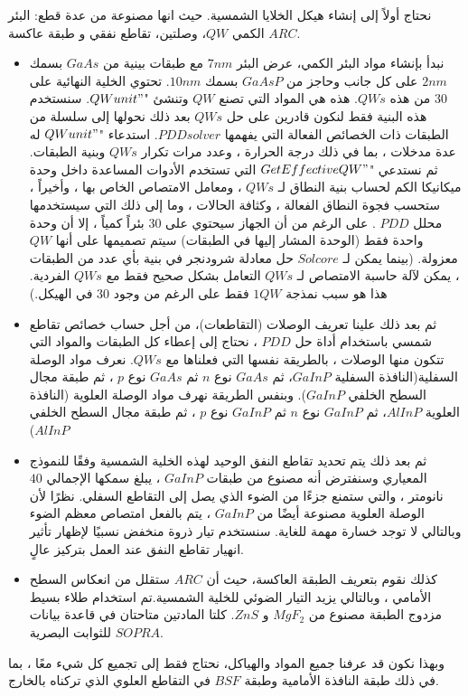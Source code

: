 	
نحتاج أولاً إلى إنشاء هيكل الخلايا الشمسية. حيث انها مصنوعة من عدة قطع: البئر الكمي $ QW $،  وصلتين، تقاطع نفقي و طبقة عاكسة $ ARC $.
\begin{itemize}
	\item 
نبدأ بإنشاء مواد البئر الكمي، عرض البئر $ 7nm $ مع طبقات بينية من $ GaAs $ بسمك $ 2nm $ على كل جانب وحاجز من $ GaAsP $ بسمك $ 10nm $. تحتوي الخلية النهائية على $ 30 $ من هذه $ QWs $. هذه هي المواد التي تصنع $ QW $ وتنشئ "$ QWunit" $. سنستخدم هذه البنية فقط لنكون قادرين على حل $ QWs $ بعد ذلك نحولها إلى سلسلة من الطبقات ذات الخصائص الفعالة التي يفهمها  $ PDD solver $. استدعاء "$ QWunit" $ له عدة مدخلات ، بما في ذلك درجة الحرارة ، وعدد مرات تكرار $ QWs $ وبنية الطبقات. ثم نستدعي "$ GetEffectiveQW" $ التي تستخدم الأدوات المساعدة داخل وحدة ميكانيكا الكم لحساب بنية النطاق لـ $ QWs $ ، ومعامل الامتصاص الخاص بها ، وأخيراً ، ستحسب فجوة النطاق الفعالة ، وكثافة الحالات ، وما إلى ذلك التي سيستخدمها محلل $ PDD $ . على الرغم من أن الجهاز سيحتوي على 30 بئراً كمياً ، إلا أن وحدة واحدة فقط (الوحدة المشار إليها في الطبقات) سيتم تصميمها على أنها $ QW $ معزولة. (بينما يمكن لـ $ Solcore $ حل معادلة شرودنجر في بنية بأي عدد من الطبقات ، يمكن لآلة حاسبة الامتصاص لـ $ QWs $ التعامل بشكل صحيح فقط مع $ QWs $ الفردية. هذا هو سبب نمذجة $ 1 QW $ فقط على الرغم من وجود $ 30 $ في الهيكل.)
	\item 
ثم بعد ذلك علينا تعريف الوصلات (التقاطعات)، من أجل حساب خصائص تقاطع شمسي باستخدام أداة حل $ PDD $ ، نحتاج إلى إعطاء كل الطبقات والمواد التي تتكون منها الوصلات ، بالطريقة نفسها التي فعلناها مع $ QWs $. نعرف مواد الوصلة السفلية(النافذة السفلية  $ GaInP $، ثم $ GaAs $ نوع $ n $ ثم $ GaAs $ نوع $ p $ ، ثم طبقة مجال السطح الخلفي $ GaInP $). وبنفس الطريقة نهرف مواد الوصلة العلوية (النافذة العلوية  $ AlInP $، ثم $ GaInP $ نوع $ n $ ثم $ GaInP $ نوع $ p $ ، ثم طبقة مجال السطح الخلفي $ AlInP $)
	\item 
ثم بعد ذلك يتم تحديد تقاطع النفق الوحيد لهذه الخلية الشمسية وفقًا للنموذج المعياري وسنفترض أنه مصنوع من طبقات $ GaInP $ ، يبلغ سمكها الإجمالي $ 40 $ نانومتر ، والتي ستمنع جزءًا من الضوء الذي يصل إلى التقاطع السفلي. نظرًا لأن الوصلة العلوية مصنوعة أيضًا من $ GaInP $ ، يتم بالفعل امتصاص معظم الضوء وبالتالي لا توجد خسارة مهمة للغاية. سنستخدم تيار ذروة منخفض نسبيًا لإظهار تأثير انهيار تقاطع النفق عند العمل بتركيز عالٍ.
	\item 
كذلك نقوم بتعريف الطبقة العاكسة، حيث أن $ ARC $ ستقلل من انعكاس السطح الأمامي ، وبالتالي يزيد التيار الضوئي للخلية الشمسية.تم استخدام طلاء بسيط مزدوج الطبقة مصنوع من $ MgF_2 $ و $ ZnS $. كلتا المادتين متاحتان في قاعدة بيانات $ SOPRA $ للثوابت البصرية.

\end{itemize}
وبهذا نكون قد عرفنا جميع المواد والهياكل، نحتاج فقط إلى تجميع كل شيء معًا ، بما في ذلك طبقة النافذة الأمامية وطبقة $ BSF $ في التقاطع العلوي الذي تركناه بالخارج.





